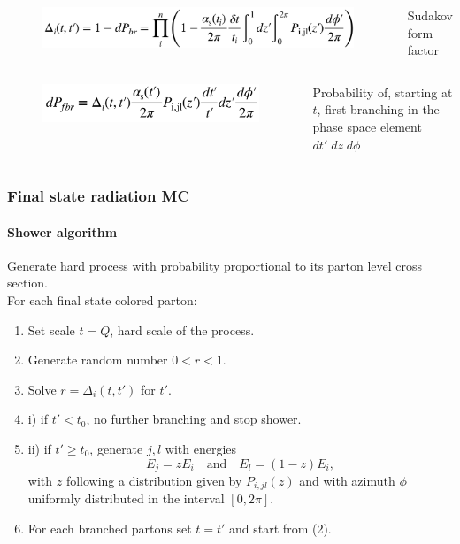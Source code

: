 \documentclass[aspectratio=43]{beamer}
\begin{document}
\begin{frame}
	\begin{columns} 
	
	
	\begin{figure}
		\includegraphics[width = 6 cm]{plots/probability4.png}
	\end{figure}
	
	
	\footnotesize Sudakov form factor
	
	\end{columns}
	
	\begin{columns} 
		
		\column{0.4\textwidth}
		
		\begin{figure}
			\includegraphics[width = 4 cm]{plots/probability5.png}
		\end{figure}
		
		\column{0.6\textwidth}
		
		\footnotesize Probability of, starting at $t$, first branching in the phase space element $dt'\; dz\; d\phi$
		
	\end{columns}

\end{frame}

\begin{frame}

	\frametitle{Final state radiation MC}
	\framesubtitle{Shower algorithm}
	
	\footnotesize Generate hard process with probability proportional to its parton level cross section. \\
	\footnotesize For each final state colored parton:
	\begin{enumerate} 
		\item \footnotesize Set scale $t = Q$, hard scale of the process.
		\item \footnotesize Generate random number $0 < r < 1$.
		\item \footnotesize Solve $r = \Delta_{i}(t, t')$ for $t'.$
		\item \footnotesize i) if $t' < t_{0}$, no further branching and stop shower.
		\item \footnotesize ii) if $t' \geq t_{0}$, generate $j, l$ with energies $$E_{j} = zE_{i} \quad \textrm{and}\quad E_{l} = (1 - z)E_{i}, $$ with $z$ following a distribution given by  $P_{i, jl}(z)$ and with azimuth $\phi$ uniformly distributed in the interval $[0, 2\pi]$.
		\item \footnotesize For each branched partons set $t = t'$ and start from (2).
	\end{enumerate}

\end{frame}
\end{document}
